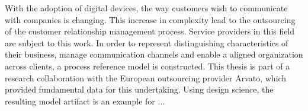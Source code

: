 \lipsum[1]

With the adoption of digital devices, the way customers wish to communicate with companies is changing. This increase in complexity lead to the outsourcing of the customer relationship management process. Service providers in this field are subject to this work. In order to represent distinguishing characteristics of their business, manage communication channels and enable a aligned organization across clients, a process reference model is constructed. This thesis is part of a research collaboration with the European outsourcing provider Arvato, which provided fundamental data for this undertaking. Using design science, the resulting model artifact is an example for ...
